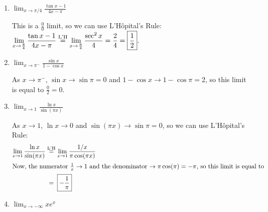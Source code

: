 \documentclass{article}
\begin{document}
\begin{enumerate}
\begin{enumerate}
    \item
      \begin{problem}[\vfill\newpage]
        $\displaystyle \lim_{x \to \pi/4 } \frac{\tan x -1}{4x - \pi}$
      \end{problem}

      \begin{solution}
        This is a $ \frac{0}{0}$ limit, so we can use L'H\^opital's Rule:
        $\displaystyle \lim_{x\to\frac{\pi}{4}}\frac{\tan x - 1}{4x - \pi}
        \stackrel{\text{L'H}}{=} \lim_{x\to\frac{\pi}{4}} \frac{\sec^2 x}{4} = \frac{2}{4} =
        \boxed{\frac{1}{2}}$.
      \end{solution}

    \item
      \begin{problem}[\vfill]
        $\displaystyle \lim_{x \to \pi^- } \frac{\sin x}{1 - \cos x}$
      \end{problem}

      \begin{solution}
        As $x \to \pi^-$, $\sin x \to \sin \pi = 0$ and $1 - \cos x \to 1
        - \cos \pi = 2$, so this limit is equal to $\frac{0}{2} =
        \boxed{0}$. 
      \end{solution}

    \item
      \begin{problem}[\vfill]
        $\displaystyle \lim_{x \to 1} \frac{\ln x}{\sin (\pi x)}$
      \end{problem}

      \begin{solution}
        As $x \to 1$, $\ln x \to 0$ and $\sin(\pi x) \to \sin \pi = 0$, so
        we can use L'H\^opital's Rule:
        \begin{align*}
          \lim_{x\to1} \frac{\ln x}{\sin(\pi x)} & \lheq \lim_{x\to1}
          \frac{1/x}{\pi\cos(\pi x)} \\
          \intertext{Now, the numerator $\frac{1}{x} \to 1$ and the
            denominator $\to \pi \cos(\pi) = - \pi$, so this limit is
            equal to} %
          & \nolheq \boxed{- \frac{1}{\pi}}
        \end{align*}
      \end{solution}

    \item
    \begin{problem}[\vfill]
        $\displaystyle\lim_{x \to -\infty}xe^x$
    \end{problem}


\end{enumerate}
\end{enumerate}
\end{document}
